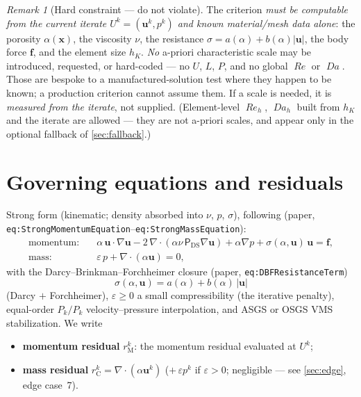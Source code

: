 \documentclass[11pt]{article}
\newcommand{\Reyn}{\operatorname{\mathit{Re}}}
\newcommand{\Damk}{\operatorname{\mathit{Da}}}
\newcommand{\DSPi}{\mathsf{P}_{\mathrm{DS}}}  %
\newcommand{\bu}{\boldsymbol{u}}
\newcommand{\bef}{\boldsymbol{f}}
\newcommand{\bx}{\boldsymbol{x}}
\newcommand{\grad}{\nabla}
\newcommand{\divg}{\nabla\!\cdot\!}
\newcommand{\rM}{r_{\mathrm M}}
\newcommand{\rC}{r_{\mathrm C}}
\theoremstyle{plain}
\theoremstyle{remark}
\newtheorem{remark}{Remark}
\begin{document}
\begin{remark}[Hard constraint --- do not violate]\label{rem:hard}
The criterion \emph{must be computable from the current iterate
$U^k=(\bu^k,p^k)$ and known material/mesh data alone}: the porosity $\alpha(\bx)$,
the viscosity $\nu$, the resistance $\sigma=a(\alpha)+b(\alpha)|\bu|$, the body
force $\bef$, and the element size $h_K$. \emph{No} a-priori characteristic scale
may be introduced, requested, or hard-coded --- no $U$, $L$, $P$, and no global
$\Reyn$ or $\Damk$. Those are bespoke to a manufactured-solution test where they
happen to be known; a production criterion cannot assume them. If a scale is
needed, it is \emph{measured from the iterate}, not supplied. (Element-level
$\Reyn_h$, $\Damk_h$ built from $h_K$ and the iterate are allowed --- they are
not a-priori scales, and appear only in the optional fallback of
\cref{sec:fallback}.)
\end{remark}

\section{Governing equations and residuals}\label{sec:governing}
Strong form (kinematic; density absorbed into $\nu$, $p$, $\sigma$), following
(paper, \texttt{eq:StrongMomentumEquation}--\texttt{eq:StrongMassEquation}):
\begin{align}
  \text{momentum:}\quad&
    \alpha\,\bu\!\cdot\!\grad\bu
    -2\,\divg(\alpha\nu\,\DSPi\grad\bu)
    +\alpha\grad p
    +\sigma(\alpha,\bu)\,\bu = \bef, \label{eq:mom}\\
  \text{mass:}\quad&
    \varepsilon\,p+\divg(\alpha\bu)=0, \label{eq:mass}
\end{align}
with the Darcy--Brinkman--Forchheimer closure (paper, \texttt{eq:DBFResistanceTerm})
\begin{equation}\label{eq:dbf}
  \sigma(\alpha,\bu)=a(\alpha)+b(\alpha)\,|\bu|
\end{equation}
(Darcy $+$ Forchheimer), $\varepsilon\ge0$ a small compressibility (the
iterative penalty), equal-order $P_k/P_k$ velocity--pressure interpolation, and
ASGS or OSGS VMS stabilization. We write
\begin{itemize}
  \item \textbf{momentum residual} $\rM^k$: the momentum residual evaluated at
    $U^k$;
  \item \textbf{mass residual} $\rC^k=\divg(\alpha\bu^k)$
    ($+\,\varepsilon p^k$ if $\varepsilon>0$; negligible --- see
    \cref{sec:edge}, edge case~7).
\end{itemize}
\end{document}
